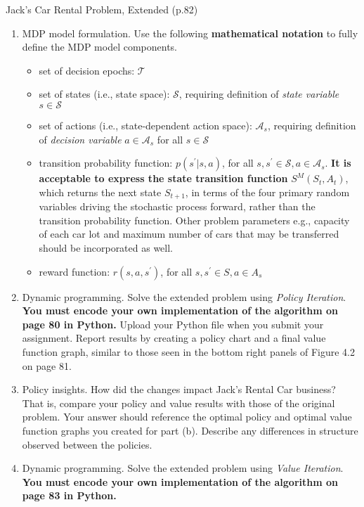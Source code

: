 \documentclass[12pt,letterpaper]{exam}
\begin{document}
\begin{questions}
\setcounter{question}{6}
\question%
Jack's Car Rental Problem, Extended (p.82)
\begin{enumerate}[label= (\alph*)]
	\item 
	MDP model formulation. 
	Use the following \textbf{mathematical notation} to fully define the MDP model components.
	\begin{itemize}
		\item set of decision epochs: \(\mathcal{T}\)
		\item set of states (i.e., state space): \(\mathcal{S}\), 
		requiring definition of \emph{state variable} \(s \in \mathcal{S}\)
		\item set of actions (i.e., state-dependent action space): \(\mathcal{A}_s\), 
		requiring definition of \emph{decision variable} \(a\in\mathcal{A}_s\) for all \(s\in\mathcal{S}\)
		\item transition probability function: \(p(s^\prime|s, a)\), 
		for all \(s, s^\prime \in \mathcal{S}, a \in \mathcal{A}_s\). 
		\textbf{It is acceptable to express the state transition function} \(S^M(S_t, A_t)\), 
		which returns the next state \(S_{t+1}\), in terms of the four primary random variables driving the stochastic process forward, 
		rather than the transition probability function. Other problem parameters \- e.g., capacity of each car lot
		and maximum number of cars that may be transferred \- should be incorporated as well.
		\item reward function: \(r(s, a, s^\prime)\), for all \(s, s^\prime \in S, a \in A_s\)
	\end{itemize}
	\item 
	Dynamic programming. Solve the extended problem using \emph{Policy Iteration}. 
	\textbf{You must encode your own implementation of the algorithm on page 80 in Python.} 
	Upload your Python file when you submit your assignment. 
	Report results by creating a policy chart and a final value function graph, 
	similar to those seen in the bottom right panels of Figure 4.2 on page 81.
	\item 
	Policy insights. How did the changes impact Jack's Rental Car business? That is, compare
	your policy and value results with those of the original problem. Your answer should reference
	the optimal policy and optimal value function graphs you created for part (b). Describe any
	differences in structure observed between the policies.
	\item 
	Dynamic programming. Solve the extended problem using \emph{Value Iteration}. 
	\textbf{You must encode your own implementation of the algorithm on page 83 in Python.} 

\end{enumerate}
\end{questions}
\end{document}
